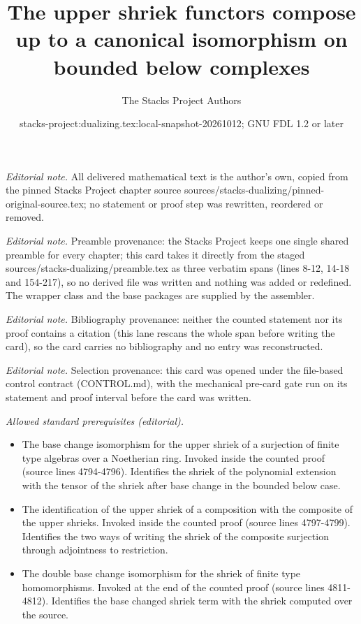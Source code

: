 \documentclass[10pt,a4paper]{amsart}
\title{The upper shriek functors compose up to a canonical isomorphism on bounded below complexes}
\author{The Stacks Project Authors}
\date{stacks-project:dualizing.tex:local-snapshot-20261012; GNU FDL 1.2 or later}
\theoremstyle{plain}
\theoremstyle{definition}
\theoremstyle{remark}
\numberwithin{equation}{subsection}
\begin{document}
\maketitle
\noindent\textit{Editorial note.} All delivered mathematical text is the author's own, copied from the pinned Stacks Project chapter source sources/stacks-dualizing/pinned-original-source.tex; no statement or proof step was rewritten, reordered or removed.\par\medskip
\noindent\textit{Editorial note.} Preamble provenance: the Stacks Project keeps one single shared preamble for every chapter; this card takes it directly from the staged sources/stacks-dualizing/preamble.tex as three verbatim spans (lines 8-12, 14-18 and 154-217), so no derived file was written and nothing was added or redefined. The wrapper class and the base packages are supplied by the assembler.\par\medskip
\noindent\textit{Editorial note.} Bibliography provenance: neither the counted statement nor its proof contains a citation (this lane rescans the whole span before writing the card), so the card carries no bibliography and no entry was reconstructed.\par\medskip
\noindent\textit{Editorial note.} Selection provenance: this card was opened under the file-based control contract (CONTROL.md), with the mechanical pre-card gate run on its statement and proof interval before the card was written.\par\medskip
\noindent\textit{Allowed standard prerequisites (editorial).}\begin{itemize}
\item The base change isomorphism for the upper shriek of a surjection of finite type algebras over a Noetherian ring. Invoked inside the counted proof (source lines 4794-4796). Identifies the shriek of the polynomial extension with the tensor of the shriek after base change in the bounded below case.
\item The identification of the upper shriek of a composition with the composite of the upper shrieks. Invoked inside the counted proof (source lines 4797-4799). Identifies the two ways of writing the shriek of the composite surjection through adjointness to restriction.
\item The double base change isomorphism for the shriek of finite type homomorphisms. Invoked at the end of the counted proof (source lines 4811-4812). Identifies the base changed shriek term with the shriek computed over the source.
\end{itemize}\medskip
\end{document}
